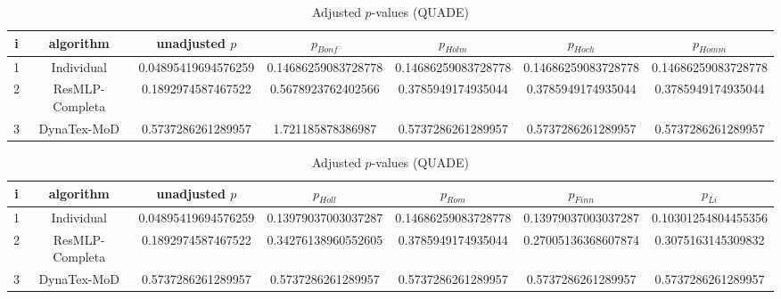 \documentclass[a4paper,10pt]{article}
\begin{document}
\begin{landscape}
\newpage

\begin{table}[!htp]
\centering\scriptsize
\caption{Adjusted $p$-values (QUADE)}
\begin{tabular}{ccccccc}
i&algorithm&unadjusted $p$&$p_{Bonf}$&$p_{Holm}$&$p_{Hoch}$&$p_{Homm}$\\
\hline
1&Individual&0.04895419694576259&0.14686259083728778&0.14686259083728778&0.14686259083728778&0.14686259083728778\\
2&ResMLP-Completa&0.1892974587467522&0.5678923762402566&0.3785949174935044&0.3785949174935044&0.3785949174935044\\
3&DynaTex-MoD&0.5737286261289957&1.721185878386987&0.5737286261289957&0.5737286261289957&0.5737286261289957\\
\hline
\end{tabular}
\end{table}

\begin{table}[!htp]
\centering\scriptsize
\caption{Adjusted $p$-values (QUADE)}
\begin{tabular}{ccccccc}
i&algorithm&unadjusted $p$&$p_{Holl}$&$p_{Rom}$&$p_{Finn}$&$p_{Li}$\\
\hline
1&Individual&0.04895419694576259&0.13979037003037287&0.14686259083728778&0.13979037003037287&0.10301254804455356\\
2&ResMLP-Completa&0.1892974587467522&0.34276138960552605&0.3785949174935044&0.27005136368607874&0.3075163145309832\\
3&DynaTex-MoD&0.5737286261289957&0.5737286261289957&0.5737286261289957&0.5737286261289957&0.5737286261289957\\
\hline
\end{tabular}
\end{table}

\end{landscape}
\end{document}
